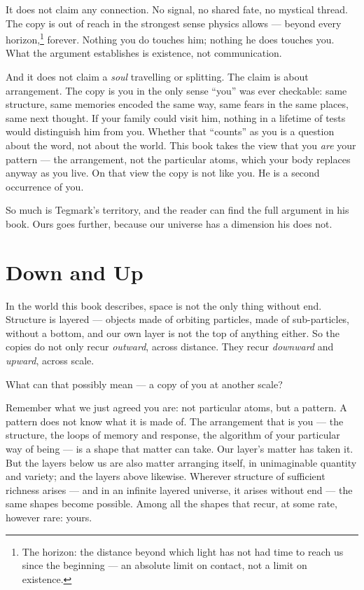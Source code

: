 \documentclass[fontsize=11pt,paper=a4,pagesize=auto,parskip=half-]{scrbook}
\begin{document}
It does not claim any connection. No signal, no shared fate, no mystical thread. The copy is out of reach in the strongest sense physics allows --- beyond every horizon,\footnote{The horizon: the distance beyond which light has not had time to reach us since the beginning --- an absolute limit on contact, not a limit on existence.} forever. Nothing you do touches him; nothing he does touches you. What the argument establishes is existence, not communication.

And it does not claim a \emph{soul} travelling or splitting. The claim is about arrangement. The copy is you in the only sense ``you'' was ever checkable: same structure, same memories encoded the same way, same fears in the same places, same next thought. If your family could visit him, nothing in a lifetime of tests would distinguish him from you. Whether that ``counts'' as you is a question about the word, not about the world. This book takes the view that you \emph{are} your pattern --- the arrangement, not the particular atoms, which your body replaces anyway as you live. On that view the copy is not like you. He is a second occurrence of you.

So much is Tegmark's territory, and the reader can find the full argument in his book. Ours goes further, because our universe has a dimension his does not.

\section{Down and Up}

In the world this book describes, space is not the only thing without end. Structure is layered --- objects made of orbiting particles, made of sub-particles, without a bottom, and our own layer is not the top of anything either. So the copies do not only recur \emph{outward}, across distance. They recur \emph{downward} and \emph{upward}, across scale.

What can that possibly mean --- a copy of you at another scale?

Remember what we just agreed you are: not particular atoms, but a pattern. A pattern does not know what it is made of. The arrangement that is you --- the structure, the loops of memory and response, the algorithm of your particular way of being --- is a shape that matter can take. Our layer's matter has taken it. But the layers below us are also matter arranging itself, in unimaginable quantity and variety; and the layers above likewise. Wherever structure of sufficient richness arises --- and in an infinite layered universe, it arises without end --- the same shapes become possible. Among all the shapes that recur, at some rate, however rare: yours.
\end{document}
